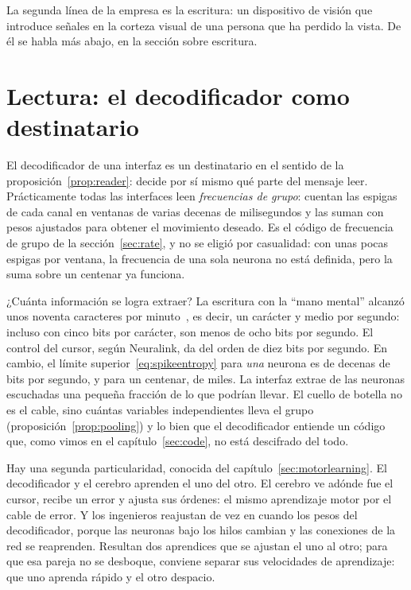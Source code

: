 La segunda línea de la empresa es la escritura: un dispositivo de visión que introduce señales en la corteza visual de una persona que ha perdido la vista. De él se habla más abajo, en la sección sobre escritura.

\section{Lectura: el decodificador como destinatario}

El decodificador de una interfaz es un destinatario en el sentido de la proposición~\ref{prop:reader}: decide por sí mismo qué parte del mensaje leer. Prácticamente todas las interfaces leen \emph{frecuencias de grupo}: cuentan las espigas de cada canal en ventanas de varias decenas de milisegundos y las suman con pesos ajustados para obtener el movimiento deseado. Es el código de frecuencia de grupo de la sección~\ref{sec:rate}, y no se eligió por casualidad: con unas pocas espigas por ventana, la frecuencia de una sola neurona no está definida, pero la suma sobre un centenar ya funciona.

¿Cuánta información se logra extraer? La escritura con la “mano mental” alcanzó unos noventa caracteres por minuto~\cite{Willett2021}, es decir, un carácter y medio por segundo: incluso con cinco bits por carácter, son menos de ocho bits por segundo. El control del cursor, según Neuralink, da del orden de diez bits por segundo. En cambio, el límite superior~\eqref{eq:spikeentropy} para \emph{una} neurona es de decenas de bits por segundo, y para un centenar, de miles. La interfaz extrae de las neuronas escuchadas una pequeña fracción de lo que podrían llevar. El cuello de botella no es el cable, sino cuántas variables independientes lleva el grupo (proposición~\ref{prop:pooling}) y lo bien que el decodificador entiende un código que, como vimos en el capítulo~\ref{sec:code}, no está descifrado del todo.

Hay una segunda particularidad, conocida del capítulo~\ref{sec:motorlearning}. El decodificador y el cerebro aprenden el uno del otro. El cerebro ve adónde fue el cursor, recibe un error y ajusta sus órdenes: el mismo aprendizaje motor por el cable de error. Y los ingenieros reajustan de vez en cuando los pesos del decodificador, porque las neuronas bajo los hilos cambian y las conexiones de la red se reaprenden. Resultan dos aprendices que se ajustan el uno al otro; para que esa pareja no se desboque, conviene separar sus velocidades de aprendizaje: que uno aprenda rápido y el otro despacio.

